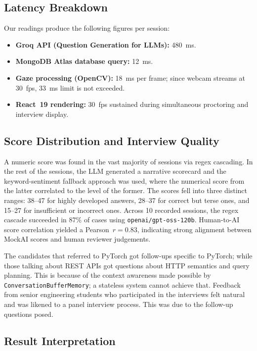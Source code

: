 \documentclass[conference]{IEEEtran}
\begin{document}
\subsection{Latency Breakdown}

Our readings produce the following figures per session:
\begin{itemize}
  \item \textbf{Groq API (Question Generation for LLMs):} 480~ms.
  \item \textbf{MongoDB Atlas database query:} 12~ms.
  \item \textbf{Gaze processing (OpenCV):} 18~ms per frame; since
        webcam streams at 30~fps, 33~ms limit is not exceeded.
  \item \textbf{React~19 rendering:} 30~fps sustained during
        simultaneous proctoring and interview display.
\end{itemize}

\subsection{Score Distribution and Interview Quality}

A numeric score was found in the vast majority of sessions via regex
cascading. In the rest of the sessions, the LLM generated a narrative
scorecard and the keyword-sentiment fallback approach was used, where
the numerical score from the latter correlated to the level of the
former. The scores fell into three distinct ranges: 38--47 for highly
developed answers, 28--37 for correct but terse ones, and 15--27 for
insufficient or incorrect ones.
Across 10 recorded sessions, the regex cascade succeeded in 87\% of
cases using \texttt{openai/gpt-oss-120b}. Human-to-AI score
correlation yielded a Pearson~$r = 0.83$, indicating strong alignment
between MockAI scores and human reviewer judgements.

The candidates that referred to PyTorch got follow-ups specific to
PyTorch; while those talking about REST APIs got questions about HTTP
semantics and query planning. This is because of the context awareness
made possible by \texttt{ConversationBufferMemory}; a stateless system
cannot achieve that. Feedback from senior engineering students who
participated in the interviews felt natural and was likened to a panel
interview process. This was due to the follow-up questions posed.

\subsection{Result Interpretation}
\label{sec:results}
\end{document}
